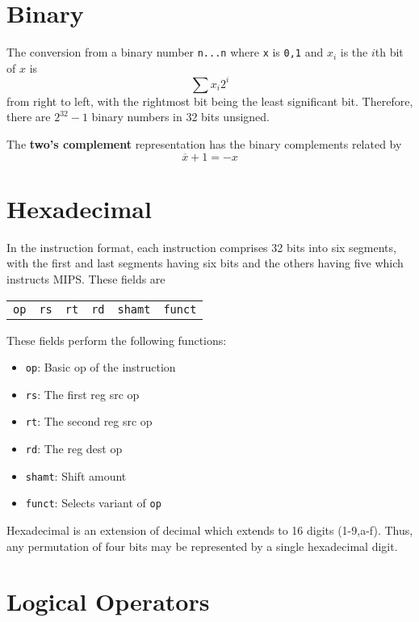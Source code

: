 \documentclass{tufte-book}
\begin{document}
\section{Binary}

The conversion from a binary number \verb|n...n| where \verb|x| is \verb|0,1| and $x_i$ is the $i$th bit of $x$ is \begin{equation}
  \sum x_i 2^i
\end{equation}
from right to left, with the rightmost bit being the least significant bit. Therefore, there are $2^{32}-1$ binary numbers in 32 bits unsigned.

\bigskip
The \textbf{two's complement} representation has the binary complements related by \begin{equation}
  \overline{x} + 1 = -x
\end{equation}

\section{Hexadecimal}
In the instruction format, each instruction comprises 32 bits into six segments, with the first and last segments having six bits and the others having five which instructs MIPS. These fields are
\begin{center}
  \begin{tabular}{cccccc}
    \verb|op| & \verb|rs| & \verb|rt| & \verb|rd| & \verb|shamt| & \verb|funct|
  \end{tabular}
\end{center}
These fields perform the following functions:
\begin{itemize}
  \item \verb|op|: Basic op of the instruction
  \item \verb|rs|: The first reg src op
  \item \verb|rt|: The second reg src op
  \item \verb|rd|: The reg dest op
  \item \verb|shamt|: Shift amount
  \item \verb|funct|: Selects variant of \verb|op|
\end{itemize}

Hexadecimal is an extension of decimal which extends to 16 digits (1-9,a-f). Thus, any permutation of four bits may be represented by a single hexadecimal digit.

\section{Logical Operators}
\end{document}
